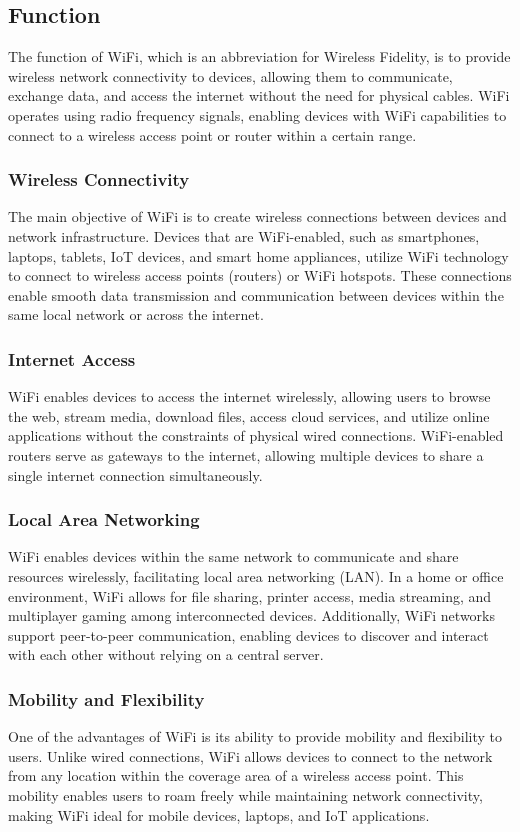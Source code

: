 \subsection{Function}
The function of WiFi, which is an abbreviation for Wireless Fidelity, is to provide wireless network connectivity to devices, allowing them to communicate, exchange data, and access the internet without the need for physical cables. WiFi operates using radio frequency signals, enabling devices with WiFi capabilities to connect to a wireless access point or router within a certain range.

\subsubsection{Wireless Connectivity}
The main objective of WiFi is to create wireless connections between devices and network infrastructure. Devices that are WiFi-enabled, such as smartphones, laptops, tablets, IoT devices, and smart home appliances, utilize WiFi technology to connect to wireless access points (routers) or WiFi hotspots. These connections enable smooth data transmission and communication between devices within the same local network or across the internet.

\subsubsection{Internet Access}
WiFi enables devices to access the internet wirelessly, allowing users to browse the web, stream media, download files, access cloud services, and utilize online applications without the constraints of physical wired connections. WiFi-enabled routers serve as gateways to the internet, allowing multiple devices to share a single internet connection simultaneously.

\subsubsection{Local Area Networking}
WiFi enables devices within the same network to communicate and share resources wirelessly, facilitating local area networking (LAN). In a home or office environment, WiFi allows for file sharing, printer access, media streaming, and multiplayer gaming among interconnected devices. Additionally, WiFi networks support peer-to-peer communication, enabling devices to discover and interact with each other without relying on a central server.

\subsubsection{Mobility and Flexibility}
One of the advantages of WiFi is its ability to provide mobility and flexibility to users. Unlike wired connections, WiFi allows devices to connect to the network from any location within the coverage area of a wireless access point. This mobility enables users to roam freely while maintaining network connectivity, making WiFi ideal for mobile devices, laptops, and IoT applications.

